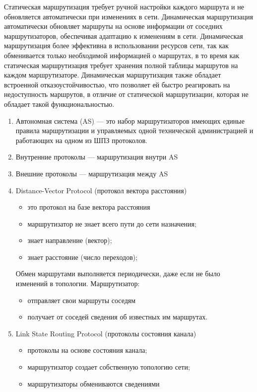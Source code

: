 Статическая маршрутизация требует ручной настройки каждого маршрута
и не обновляется автоматически при изменениях в сети.
Динамическая маршрутизация автоматически обновляет маршруты
на основе информации от соседних маршрутизаторов,
обеспечивая адаптацию к изменениям в сети.
Динамическая маршрутизация более эффективна в использовании ресурсов сети,
так как обменивается только необходимой информацией о маршрутах,
в то время как статическая маршрутизация требует хранения полной таблицы
маршрутов на каждом маршрутизаторе. Динамическая маршрутизация также обладает
встроенной отказоустойчивостью,
что позволяет ей быстро реагировать на недоступность маршрутов,
в отличие от статической маршрутизации,
которая не обладает такой функциональностью.

\begin{enumerate}
	\item Автономная система (AS) --- это набор маршрутизаторов имеющих
		единые правила маршрутизации и управляемых одной технической
		администрацией и работающих на одном из ШПЗ протоколов.
	\item Внутренние протоколы --- маршрутизация внутри AS
	\item Внешние протоколы --- маршрутизация между AS
	\item Distance-Vector Protocol (протокол вектора расстояния)
	\begin{itemize}
		\item это протокол на базе вектора расстояния
		\item маршрутизатор не знает всего пути до сети назначения;
		\item знает направление (вектор);
		\item знает расстояние (число переходов);
	\end{itemize}
		Обмен маршрутами выполняется периодически,
		даже если не было изменений в топологии. Маршрутизатор:
	\begin{itemize}
		\item отправляет свои маршруты соседям
		\item получает от соседей сведения об известных им маршрутах.
	\end{itemize}
	\item Link State Routing Protocol (протоколы состояния канала)
	\begin{itemize}
		\item протоколы на основе состояния канала;
		\item маршрутизатор создает собственную топологию сети;
		\item маршрутизаторы обмениваются сведениями

\end{itemize}
\end{enumerate}
